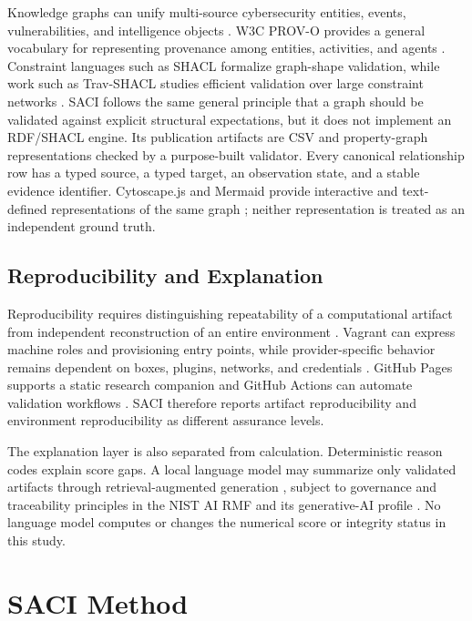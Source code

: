 \documentclass[a4paper,conference]{IEEEtran}
\begin{document}
Knowledge graphs can unify multi-source cybersecurity entities, events, vulnerabilities, and intelligence objects \cite{liu2022}. W3C PROV-O provides a general vocabulary for representing provenance among entities, activities, and agents \cite{w3cprov}. Constraint languages such as SHACL formalize graph-shape validation, while work such as Trav-SHACL studies efficient validation over large constraint networks \cite{w3c_shacl,figuera2021travshacl}. SACI follows the same general principle that a graph should be validated against explicit structural expectations, but it does not implement an RDF/SHACL engine. Its publication artifacts are CSV and property-graph representations checked by a purpose-built validator. Every canonical relationship row has a typed source, a typed target, an observation state, and a stable evidence identifier. Cytoscape.js and Mermaid provide interactive and text-defined representations of the same graph \cite{cytoscapejs,mermaid}; neither representation is treated as an independent ground truth.

\subsection{Reproducibility and Explanation}
Reproducibility requires distinguishing repeatability of a computational artifact from independent reconstruction of an entire environment \cite{nas_repro,acm_artifacts}. Vagrant can express machine roles and provisioning entry points, while provider-specific behavior remains dependent on boxes, plugins, networks, and credentials \cite{vagrant_docs,vagrant_vmware}. GitHub Pages supports a static research companion and GitHub Actions can automate validation workflows \cite{github_pages,github_actions}. SACI therefore reports artifact reproducibility and environment reproducibility as different assurance levels.

The explanation layer is also separated from calculation. Deterministic reason codes explain score gaps. A local language model may summarize only validated artifacts through retrieval-augmented generation \cite{lewis2020}, subject to governance and traceability principles in the NIST AI RMF and its generative-AI profile \cite{nist_airmf,nist_genai}. No language model computes or changes the numerical score or integrity status in this study.

\section{SACI Method}
\end{document}
